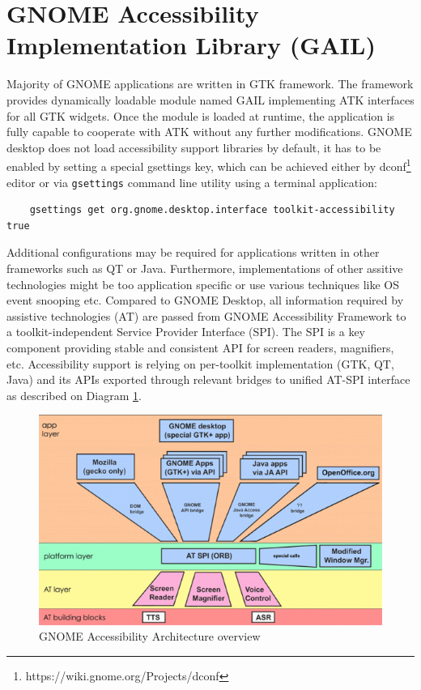 \section{GNOME Accessibility Implementation Library (GAIL)}
Majority of GNOME applications are written in GTK framework. The framework provides dynamically loadable module named GAIL implementing ATK interfaces for all GTK widgets. Once the module is loaded at runtime, the application is fully capable to cooperate with ATK without any further modifications.
GNOME desktop does not load accessibility support libraries by default, it has to be enabled by setting a special gsettings key, which can be achieved either by dconf\footnote{https://wiki.gnome.org/Projects/dconf} editor or via \texttt{gsettings} command line utility using a terminal application:
\begin{verbatim}
    gsettings get org.gnome.desktop.interface toolkit-accessibility true
\end{verbatim}
Additional configurations may be required for applications written in other frameworks such as QT or Java. Furthermore, implementations of other assitive technologies might be too application specific or use various techniques like OS event snooping etc. Compared to GNOME Desktop, all information required by assistive technologies (AT) are passed from GNOME Accessibility Framework to a toolkit-independent Service Provider Interface (SPI). The SPI is a key component providing stable and consistent API for screen readers, magnifiers, etc. Accessibility support is relying on per-toolkit implementation (GTK, QT, Java) and its APIs exported through relevant bridges to unified AT-SPI interface as described on Diagram \ref{ATSPI_architecture}.

\begin{figure}[hbt]
	\centering
	\includegraphics[width=1\textwidth]{obrazky-figures/GNOME_desktop_Accessibility.png}
	\caption{GNOME Accessibility Architecture overview}
	\label{ATSPI_architecture}
\end{figure}

